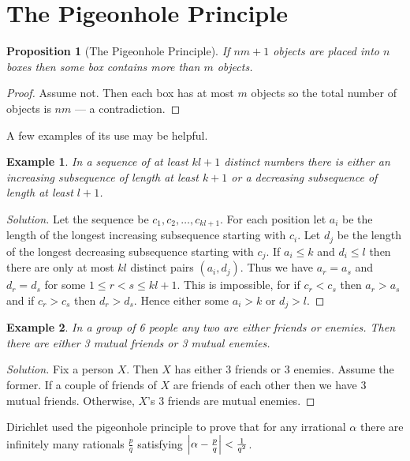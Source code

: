 \documentclass{notes}
\theoremstyle{plain}
\newtheorem*{example}{Example}
\newtheorem*{proposition}{Proposition}
\begin{document}
\section{The Pigeonhole Principle}

\begin{proposition}[The Pigeonhole Principle]
If $n m + 1$ objects are placed into $n$ boxes then some box contains more
than $m$ objects.
\end{proposition}

\begin{proof}
Assume not.  Then each box has at most $m$ objects so the total number
of objects is $n m$ --- a contradiction.
\end{proof}

A few examples of its use may be helpful.

\begin{example}
In a sequence of at least $k l + 1$ distinct numbers there is either an
increasing subsequence of length at least $k + 1$ or a decreasing
subsequence of length at least $l + 1$.
\end{example}

\begin{proof}[Solution]
Let the sequence be $c_1, c_2, \dots, c_{k l + 1}$.  For each position let
$a_i$ be the length of the longest increasing subsequence starting with
$c_i$.  Let $d_j$ be the length of the longest decreasing subsequence
starting with $c_j$.  If $a_i \le k$ and $d_i \le l$ then there are
only at most $k l$ distinct pairs $(a_i,d_j)$.  Thus we have
$a_r = a_s$ and $d_r = d_s$ for some $1 \le r < s \le k l + 1$.  This
is impossible, for if $c_r < c_s$ then $a_r > a_s$ and if $c_r > c_s$ then
$d_r > d_s$.  Hence either some $a_i > k$ or $d_j > l$.
\end{proof}

\begin{example}
In a group of 6 people any two are either friends or enemies.  Then there
are either 3 mutual friends or 3 mutual enemies.
\end{example}

\begin{proof}[Solution]
Fix a person $X$.  Then $X$ has either 3 friends or 3 enemies.  Assume the
former.  If a couple of friends of $X$ are friends of each other then
we have 3 mutual friends.  Otherwise, $X$'s 3 friends are mutual enemies.
\end{proof}

Dirichlet used the pigeonhole principle to prove that for any irrational
$\alpha$ there are infinitely many rationals $\frac{p}{q}$ satisfying
$\left|\alpha - \frac{p}{q}\right| < \frac{1}{q^2}$.
\end{document}
